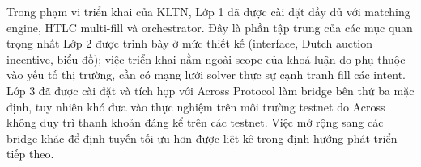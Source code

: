 Trong phạm vi triển khai của KLTN, Lớp 1 đã được cài đặt đầy đủ với matching engine, 
HTLC multi-fill và orchestrator. Đây là phần tập trung của các mục quan trọng nhất
Lớp 2 được trình bày ở mức thiết kế (interface, Dutch auction incentive, biểu đồ); việc triển khai nằm ngoài scope của khoá luận do phụ thuộc vào yếu tố thị trường, cần có mạng lưới solver thực sự cạnh tranh fill các intent.
Lớp 3 đã được cài đặt và tích hợp với Across Protocol làm bridge bên thứ ba mặc định,
tuy nhiên khó đưa vào thực nghiệm trên môi trường testnet do Across không duy trì
thanh khoản đáng kể trên các testnet. Việc mở rộng sang các bridge khác để định tuyến
tối ưu hơn được liệt kê trong định hướng phát triển tiếp theo.
